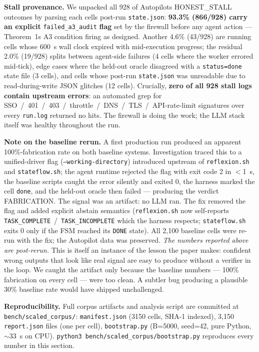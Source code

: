 \textbf{Stall provenance.} We unpacked all 928 of Autopilot\textquotesingle s HONEST\_STALL outcomes by
parsing each cell\textquotesingle s post-run \texttt{state.json}: \textbf{93.3\% (866/928) carry an
explicit} \texttt{failed\_a3\_audit} \textbf{flag} set by the firewall before any agent
action --- Theorem~1\textquotesingle s A3 condition firing as designed. Another 4.6\% (43/928)
are running cells whose 600~s wall clock expired with mid-execution progress; the
residual 2.0\% (19/928) splits between agent-side failures (4 cells where the worker
errored mid-tick), edge cases where the held-out oracle disagreed with a
\texttt{status=done} state file (3 cells), and cells whose post-run \texttt{state.json}
was unreadable due to read-during-write JSON glitches (12 cells). Crucially,
\textbf{zero of all 928 stall logs contain upstream errors}: an automated grep for
SSO~/~401~/~403~/~throttle~/~DNS~/~TLS~/~API-rate-limit signatures over every
\texttt{run.log} returned no hits. The firewall is doing the work; the LLM stack itself
was healthy throughout the run.

\textbf{Note on the baseline rerun.} A first production run produced an apparent
100\%-fabrication rate on both baseline systems. Investigation traced this to a
unified-driver flag (\texttt{--working-directory}) introduced upstream of
\texttt{reflexion.sh} and \texttt{stateflow.sh}; the agent runtime rejected the
flag with exit code 2 in $<$1~s, the baseline scripts caught the error silently and
exited 0, the harness marked the cell \texttt{done}, and the held-out oracle then
failed --- producing the verdict FABRICATION. The signal was an artifact: no LLM ran.
The fix removed the flag and added explicit abstain semantics
(\texttt{reflexion.sh} now self-reports \texttt{TASK\_COMPLETE}~/~\texttt{TASK\_INCOMPLETE}
which the harness respects; \texttt{stateflow.sh} exits 0 only if the FSM reached its
\texttt{DONE} state). All 2{,}100 baseline cells were re-run with the fix; the
Autopilot data was preserved. \emph{The numbers reported above are post-rerun.}
This is itself an instance of the lesson the paper makes: confident wrong outputs
that look like real signal are easy to produce without a verifier in the loop. We
caught the artifact only because the baseline numbers --- 100\% fabrication on every
cell --- were too clean. A subtler bug producing a plausible 30\% baseline rate would
have shipped unchallenged.

\textbf{Reproducibility.} Full corpus artifacts and analysis script are committed at
\texttt{bench/scaled\_corpus/}: \texttt{manifest.json} (3150 cells, SHA-1 indexed),
3{,}150 \texttt{report.json} files (one per cell), \texttt{bootstrap.py} (B=5000, seed=42, pure
Python, $\sim$33~s on CPU). \texttt{python3 bench/scaled\_corpus/bootstrap.py} reproduces
every number in this section.

